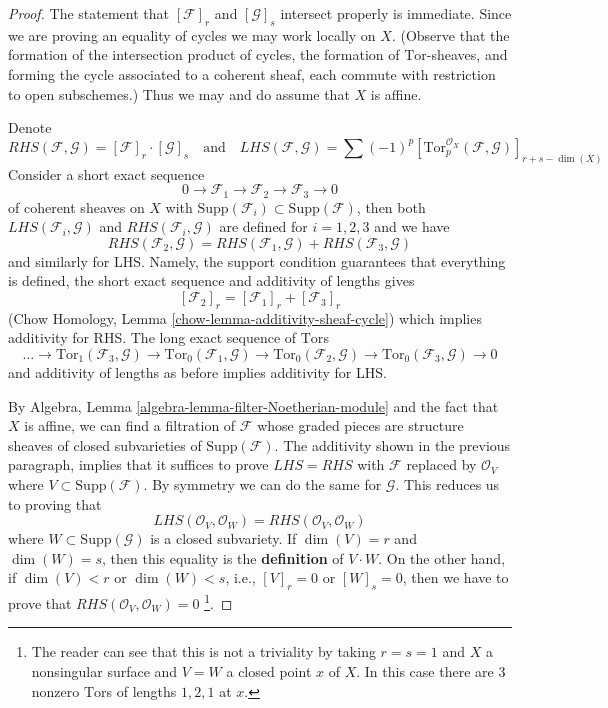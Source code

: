 \begin{proof}

The statement that $[\mathcal{F}]_r$ and $[\mathcal{G}]_s$ intersect properly
is immediate. Since we are proving an equality of cycles we may work
locally on $X$. (Observe that the formation of the intersection
product of cycles, the formation of $\text{Tor}$-sheaves, and
forming the cycle associated to a coherent sheaf, each commute with
restriction to open subschemes.) Thus we may and do assume that $X$ is affine.

\medskip\noindent
Denote
$$
RHS(\mathcal{F}, \mathcal{G}) = [\mathcal{F}]_r \cdot [\mathcal{G}]_s
\quad\text{and}\quad
LHS(\mathcal{F}, \mathcal{G}) = \sum (-1)^p
[\text{Tor}_p^{\mathcal{O}_X}(\mathcal{F}, \mathcal{G})]_{r + s - \dim(X)}
$$
Consider a short exact sequence
$$
0 \to \mathcal{F}_1 \to \mathcal{F}_2 \to \mathcal{F}_3 \to 0
$$
of coherent sheaves on $X$ with
$\text{Supp}(\mathcal{F}_i) \subset \text{Supp}(\mathcal{F})$,
then both $LHS(\mathcal{F}_i, \mathcal{G})$ and
$RHS(\mathcal{F}_i, \mathcal{G})$ are defined for $i = 1, 2, 3$
and we have
$$
RHS(\mathcal{F}_2, \mathcal{G}) =
RHS(\mathcal{F}_1, \mathcal{G}) + RHS(\mathcal{F}_3, \mathcal{G})
$$
and similarly for LHS. Namely, the support condition guarantees that
everything is defined, the short exact sequence and additivity of lengths
gives
$$
[\mathcal{F}_2]_r = [\mathcal{F}_1]_r  + [\mathcal{F}_3]_r
$$
(Chow Homology, Lemma \ref{chow-lemma-additivity-sheaf-cycle})
which implies additivity for RHS. The long exact sequence of $\text{Tor}$s
$$
\ldots \to \text{Tor}_1(\mathcal{F}_3, \mathcal{G}) \to
\text{Tor}_0(\mathcal{F}_1, \mathcal{G}) \to
\text{Tor}_0(\mathcal{F}_2, \mathcal{G}) \to
\text{Tor}_0(\mathcal{F}_3, \mathcal{G}) \to 0
$$
and additivity of lengths as before implies additivity for LHS.

\medskip\noindent
By Algebra, Lemma \ref{algebra-lemma-filter-Noetherian-module}
and the fact that $X$ is affine, we can find a filtration of $\mathcal{F}$
whose graded pieces are structure sheaves of closed subvarieties of
$\text{Supp}(\mathcal{F})$. The additivity shown in the previous paragraph,
implies that it suffices to prove $LHS = RHS$ with
$\mathcal{F}$ replaced by $\mathcal{O}_V$ where
$V \subset \text{Supp}(\mathcal{F})$.
By symmetry we can do the same for $\mathcal{G}$.
This reduces us to proving that
$$
LHS(\mathcal{O}_V, \mathcal{O}_W) = RHS(\mathcal{O}_V, \mathcal{O}_W)
$$
where $W \subset \text{Supp}(\mathcal{G})$ is a closed subvariety.
If $\dim(V) = r$ and $\dim(W) = s$, then this equality is the
{\bf definition} of $V \cdot W$. On the other hand, if
$\dim(V) < r$ or $\dim(W) < s$, i.e., $[V]_r = 0$ or $[W]_s = 0$,
then we have to prove that $RHS(\mathcal{O}_V, \mathcal{O}_W) = 0$
\footnote{The reader can see that this is not a triviality by
taking $r = s = 1$ and $X$ a nonsingular surface and $V = W$
a closed point $x$ of $X$. In this case there are $3$ nonzero
$\text{Tor}$s of lengths $1, 2, 1$ at $x$.}.


\end{proof}
